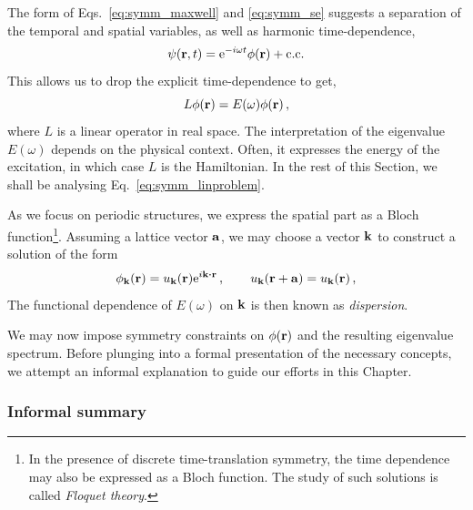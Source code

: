 The form of Eqs.~\eqref{eq:symm_maxwell} and \eqref{eq:symm_se} suggests a separation of the temporal and spatial variables, as well as harmonic time-dependence,
%
\begin{equation} \label{eq:symm_sol_gen}
\psi(\vb{r}, t) = {\rm e}^{-i \omega t} \phi(\vb{r}) + \text{c.c.} 
\end{equation}
%
This allows us to drop the explicit time-dependence to get,
\begin{equation} \label{eq:symm_linproblem}
L \phi(\vb{r}) = E(\omega) \phi(\vb{r})\,,
\end{equation}
where $L$ is a linear operator in real space. The interpretation of the eigenvalue $E(\omega)$ depends on the physical context. Often, it expresses the energy of the excitation, in which case $L$ is the Hamiltonian. In the rest of this Section, we shall be analysing Eq.~\eqref{eq:symm_linproblem}.

As we focus on periodic structures, we express the spatial part as a Bloch function\footnote{In the presence of discrete time-translation symmetry, the time dependence may also be expressed as a Bloch function. The study of such solutions is called \textit{Floquet theory}.}. Assuming a lattice vector $\vb{a}$, we may choose a vector $\vb{k}$ to construct a solution of the form
\begin{equation} \label{eq:symm_sol_gen_space}
\phi_{\vb{k}}(\vb{r}) = u_{\vb{k}}(\vb{r}) \e^{i \vb{k} \vdot \vb{r}} \,, \qquad u_{\vb{k}}(\vb{r} + \vb{a}) = u_{\vb{k}}(\vb{r}) \,,
\end{equation}
The functional dependence of $E(\omega)$ on $\vb{k}$ is then known as \textit{dispersion}.

We may now impose symmetry constraints on $\phi(\vb{r})$ and the resulting eigenvalue spectrum. Before plunging into a formal presentation of the necessary concepts, we attempt an informal explanation to guide our efforts in this Chapter. 

\subsubsection{Informal summary} 

